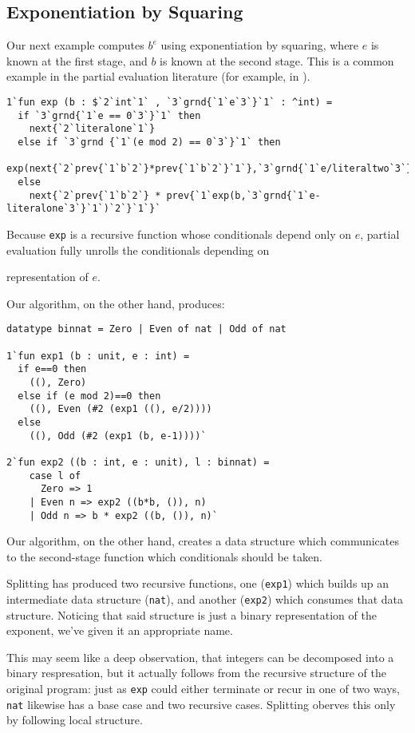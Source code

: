 \subsection{Exponentiation by Squaring}


Our next example computes $b^e$ using exponentiation by squaring, where $e$ is
known at the first stage, and $b$ is known at the second stage. This is a common
example in the partial evaluation literature (for example, in \cite{jones96}).
%
\begin{lstlisting} 
1`fun exp (b : $`2`int`1` , `3`grnd{`1`e`3`}`1` : ^int) = 
  if `3`grnd{`1`e == 0`3`}`1` then 
    next{`2`literalone`1`}
  else if `3`grnd {`1`(e mod 2) == 0`3`}`1` then
    exp(next{`2`prev{`1`b`2`}*prev{`1`b`2`}`1`},`3`grnd{`1`e/literaltwo`3`}`1`)
  else 
    next{`2`prev{`1`b`2`} * prev{`1`exp(b,`3`grnd{`1`e-literalone`3`}`1`)`2`}`1`}`
\end{lstlisting}
%
Because \texttt{exp} is a recursive function whose conditionals depend only on
$e$, partial evaluation fully unrolls the conditionals depending on

representation of $e$. 

Our algorithm, on the other hand, produces:
%
\begin{lstlisting} 
datatype binnat = Zero | Even of nat | Odd of nat

1`fun exp1 (b : unit, e : int) =
  if e==0 then
    ((), Zero)
  else if (e mod 2)==0 then 
    ((), Even (#2 (exp1 ((), e/2))))
  else 
    ((), Odd (#2 (exp1 (b, e-1))))`

2`fun exp2 ((b : int, e : unit), l : binnat) =
    case l of
      Zero => 1
    | Even n => exp2 ((b*b, ()), n)
    | Odd n => b * exp2 ((b, ()), n)`
\end{lstlisting}
%

Our algorithm, on the other hand, creates a data
structure which communicates to the second-stage function which conditionals
should be taken.

Splitting has produced two recursive functions,
one (\texttt{exp1}) which builds up an intermediate data structure (\texttt{nat}),
and another (\texttt{exp2}) which consumes that data structure.  
Noticing that said structure is just a binary representation of the exponent,
we've given it an appropriate name.

This may seem like a deep observation, 
that integers can be decomposed into a binary respresation,
but it actually follows from the recursive structure of the original program:
just as \texttt{exp} could either terminate or recur in one of two ways,
\texttt{nat} likewise has a base case and two recursive cases.
Splitting oberves this only by following local structure.

